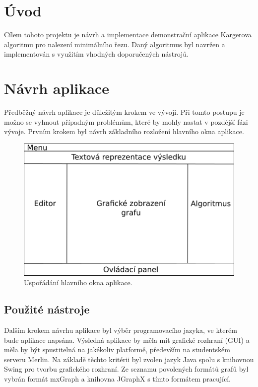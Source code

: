 \documentclass[../projekt.tex]{subfiles}
\begin{document}

\section{Úvod}\label{uvod}

Cílem tohoto projektu je návrh a implementace demonstrační aplikace Kargerova algoritmu pro nalezení minimálního řezu. Daný algoritmus byl navržen a implementován s využitím vhodných doporučených nástrojů. 




\section{Návrh aplikace}

Předběžný návrh aplikace je důležitým krokem ve vývoji. Při tomto postupu je možno se vyhnout případným problémům, které by mohly nastat v pozdější fázi vývoje. Prvním krokem byl návrh základního rozložení hlavního okna aplikace.  \\

	\begin{figure}[ht]
    	\begin{center}
  			\includegraphics[scale=0.7]{obrazky-figures/layout.png}
  			\caption{Uspořádání hlavního okna aplikace.}
  			\label{fig:layout}
  		\end{center}
	\end{figure}

\subsection{Použité nástroje}

Dalším krokem návrhu aplikace byl výběr programovacího jazyka, ve kterém bude aplikace napsána. Výsledná aplikace by měla mít grafické rozhraní (GUI) a měla by být spustitelná na jakékoliv platformě, především na studentském serveru Merlin. Na základě těchto kritérii byl zvolen jazyk Java spolu s knihovnou Swing pro tvorbu grafického rozhraní. Ze seznamu povolených formátů grafů byl vybrán formát mxGraph a knihovna JGraphX s tímto formátem pracující. \\
\end{document}
